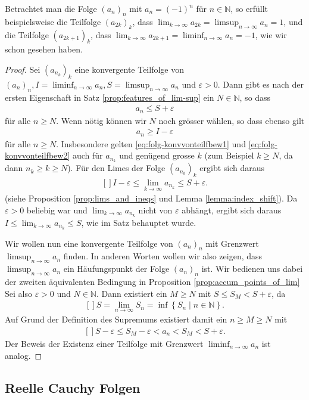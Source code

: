 \documentclass[../Analysis1_script.tex]{subfiles}
\begin{document}
\begin{example}
	Betrachtet man die Folge $(a_n)_n$ mit $a_n = (-1)^n$ für $n \in \mathbb {N}$, so erfüllt beispielsweise die Teilfolge $(a_{2k})_k$, dass $\lim _{k \to \infty }a_{2k} = \limsup _{n \to \infty } a_n = 1$, und die Teilfolge $(a_{2k+1})_k$, dass $\lim _{k \to \infty }a_{2k+1} = \liminf _{n \to \infty } a_n = -1$, wie wir schon gesehen haben.
\end{example}

\begin{proof}
	 Sei $(a_{n_k})_k$ eine konvergente Teilfolge von $(a_n)_n, I = \liminf _{n \to \infty }a_n, S = \limsup _{n \to \infty }a_n$ und $\varepsilon >0$. Dann gibt es nach der ersten Eigenschaft in Satz \ref{prop:features_of_lim-sup} ein $N \in \mathbb {N}$, so dass
	\begin{align}\label{eq:folg-konvvonteilfbew1} 
		a_n \leq S + \varepsilon
	\end{align}
	für alle $n \geq N$. Wenn nötig können wir $N$ noch grösser wählen, so dass ebenso gilt
	\begin{align}\label{eq:folg-konvvonteilfbew2} 
		a_n \geq I- \varepsilon
	\end{align}
	für alle $n \geq N$. Insbesondere gelten \ref{eq:folg-konvvonteilfbew1} und \ref{eq:folg-konvvonteilfbew2} auch für $a_{n_k}$ und genügend grosse $k$ (zum Beispiel $k \geq N$, da dann $n_k \geq k \geq N$). Für den Limes der Folge $(a_{n_k})_k$ ergibt sich daraus
	\[\begin{aligned}[]
		I - \varepsilon \leq \lim _{k \to \infty } a_{n_k} \leq S + \varepsilon .
	\end{aligned}\]
	(siehe Proposition \ref{prop:lims_and_ineqs} und Lemma \ref{lemma:index_shift}). Da $\varepsilon >0$ beliebig war und $\lim _{k \to \infty } a_{n_k}$ nicht von $\varepsilon$ abhängt, ergibt sich daraus $I \leq \lim _{k \to \infty } a_{n_k} \leq S$, wie im Satz behauptet wurde.
	
	Wir wollen nun eine konvergente Teilfolge von $(a_n)_n$ mit Grenzwert $\limsup _{n\to \infty }a_n$ finden. In anderen Worten wollen wir also zeigen, dass $\limsup _{n\to \infty }a_n$ ein Häufungspunkt der Folge $(a_n)_n$ ist. Wir bedienen uns dabei der zweiten äquivalenten Bedingung in Proposition \ref{prop:accum_points_of_lim} Sei also $\varepsilon >0$ und $N\in \mathbb {N}$. Dann existiert ein $M\geq N$ mit $S\leq S_M< S+\varepsilon$, da
	\[\begin{aligned}[]
		S=\lim _{n\to \infty }S_n=\inf \left \lbrace {S_n} \mid {n\in \mathbb {N}}\right \rbrace .
	\end{aligned}\]
	Auf Grund der Definition des Supremums existiert damit ein $n\geq M\geq N$ mit
	\[\begin{aligned}[]
		S-\varepsilon \leq S_M-\varepsilon <a_n<S_M<S+\varepsilon .
	\end{aligned}\]
	Der Beweis der Existenz einer Teilfolge mit Grenzwert $\liminf _{n \to \infty }a_n$ ist analog. 
\end{proof}

\subsection{Reelle Cauchy Folgen}
\end{document}
